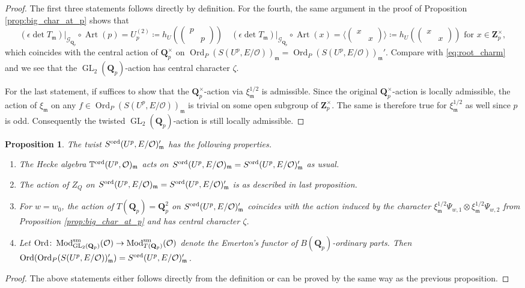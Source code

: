 \documentclass[leqno]{amsart}
\newtheorem{prop}[thm]{Proposition}
\theoremstyle{definition}
\theoremstyle{remark}
\newcommand{\smat}[1]{\left(\begin{smallmatrix} #1 \end{smallmatrix}\right)}
\newcommand{\oo}{\mathcal{O}}
\newcommand{\Qp}{\mathbf{Q}_p}
\newcommand{\Zp}{\mathbf{Z}_p}
\DeclareMathOperator{\GL}{GL}
\DeclareMathOperator{\Art}{Art}
\newcommand{\fm}{\mathfrak{m}}
\DeclareMathOperator{\Mod}{\textnormal{Mod}}
\DeclareMathOperator{\Ord}{Ord} %
\newcommand{\Gp}{\mathcal{G}_{\Qp}} %
\newcommand{\sm}{\textnormal{sm}}
\newcommand{\TT}{\mathbb{T}} %
\newcommand{\ord}{\textnormal{ord}} %
\begin{document}
\begin{proof}

The first three statements follows directly by definition.
For the fourth, the same argument in the proof of
Proposition \ref{prop:big_char_at_p} shows that 
\[
    (\epsilon \det T_\fm)\vert_{\Gp}\circ \Art(p)=
    U_{p}^{(2)}\coloneqq h_U(\smat{p&\\&p})\quad
    (\epsilon \det T_\fm)\vert_{\Gp}\circ \Art(x)=
    \langle \smat{x&\\&x}\rangle
    \coloneqq h_U(\smat{x&\\&x})\text{ for }x\in\Zp^\times,
\]
which coincides with the central action of $\Qp^\times$ on
$\Ord_P(S(U^p,E/\oo))_\fm=\Ord_P(S(U^p,E/\oo))_\fm'$.
Compare with \eqref{eq:root_charm}
and we see that the $\GL_2(\Qp)$-action
has central character $\zeta$.

For the last statement,
if suffices to show that the $\Qp^\times$-action
via $\xi_\fm^{1/2}$ is admissible.
Since the original $\Qp^\times$-action is locally admissible,
the action of $\xi_\fm$ on
any $f\in \Ord_P(S(U^p,E/\oo))_\fm$
is trivial on some open subgroup of $\Zp^\times$.
The same is therefore true for $\xi_\fm^{1/2}$ as well
since $p$ is odd.
Consequently the twisted $\GL_2(\Qp)$-action
is still locally admissible.

\end{proof}


\begin{prop}\label{prop:twist_ord}
The twist $S^{\ord}(U^p,E/\oo)_\fm'$
has the following properties.
\begin{enumerate}
\item The Hecke algebra $\TT^{\ord}(U^p,\oo)_{\fm}$
acts on $S^{\ord}(U^p,E/\oo)_\fm=S^{\ord}(U^p,E/\oo)_\fm'$
as usual.

\item The action of $Z_Q$ on
$S^{\ord}(U^p,E/\oo)_\fm=S^{\ord}(U^p,E/\oo)_\fm'$
is as described in last proposition.

\item For $w=w_0$,
the action of $T(\Qp)=\Qp^2$ on $S^{\ord}(U^p,E/\oo)_\fm'$
coincides with the action induced by the character
$\xi_\fm^{1/2}\Psi_{w,1}\otimes \xi_\fm^{1/2}\Psi_{w,2}$
from Proposition \ref{prop:big_char_at_p}
and has central character $\zeta$.

\item 
Let $\Ord\colon \Mod^{\sm}_{\GL_2(\Qp)}(\oo)
\to \Mod^{\sm}_{T(\Qp)}(\oo)$ denote the Emerton's
functor of $B(\Qp)$-ordinary parts.
Then $\Ord(\Ord_P(S(U^p,E/\oo))_\fm')=S^{\ord}(U^p,E/\oo)_\fm'$.

\end{enumerate}
\end{prop}
\begin{proof}
The above statements either follows directly from 
the definition or can be proved by the same way
as the previous proposition.
\end{proof}
\end{document}
